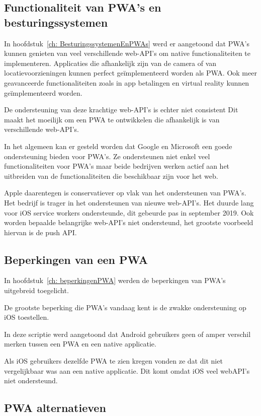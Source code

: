 	\subsection{Functionaliteit van PWA's en besturingssystemen}
	
		In hoofdstuk~\ref{ch: BesturingssystemenEnPWAs} werd er aangetoond dat PWA's kunnen genieten van veel verschillende web-API's om native functionaliteiten te implementeren. Applicaties die afhankelijk zijn van de camera of van locatievoorzieningen kunnen perfect geïmplementeerd worden als PWA. Ook meer geavanceerde functionaliteiten zoals in app betalingen en virtual reality kunnen geïmplementeerd worden.
		
		De ondersteuning van deze krachtige web-API's is echter niet consistent Dit maakt het moeilijk om een PWA te ontwikkelen die afhankelijk is van verschillende web-API's. 
		
		In het algemeen kan er gesteld worden dat Google en Microsoft een goede ondersteuning bieden voor PWA's. Ze ondersteunen niet enkel veel functionaliteiten voor PWA's maar beide bedrijven werken actief aan het uitbreiden van de functionaliteiten die beschikbaar zijn voor het web. 
		
		Apple daarentegen is conservatiever op vlak van het ondersteunen van PWA's. Het bedrijf is trager in het ondersteunen van nieuwe web-API's. 
		Het duurde lang voor iOS service workers ondersteunde, dit gebeurde pas in september 2019. Ook worden bepaalde belangrijke web-API's niet ondersteund, het grootste voorbeeld hiervan is de push API.
					
	\subsection{Beperkingen van een PWA}
		In hoofdstuk~\ref{ch: beperkingenPWA} werden de beperkingen van PWA's uitgebreid toegelicht. 
	
		De grootste beperking die PWA's vandaag kent is de zwakke ondersteuning op iOS toestellen.
		
		In deze scriptie werd aangetoond dat Android gebruikers geen of amper verschil merken tussen een PWA en een native applicatie.  
		
		Als iOS gebruikers dezelfde PWA te zien kregen vonden ze dat dit niet vergelijkbaar was aan een native applicatie. Dit komt omdat iOS veel webAPI's niet ondersteund.
		
	 
	
	\subsection{PWA alternatieven}
		
